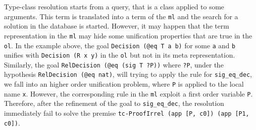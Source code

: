 \documentclass[acmengage]{acmart}
\def\coq{\proglang{coq}}
\newcommand*{\acronym}[1]{\texttt{#1}\xspace}
\def\ol{\acronym{ol}} %
\def\ml{\acronym{ml}} %
\begin{document}
Type-class resolution starts from a query, that is a class applied to some
arguments. This \coq term is translated into a term of the \ml and the search
for a solution in the database is started. However, it may happen that the term
representation in the \ml may hide some unification properties that are true in
the \ol. In the example above, the goal \texttt{Decision (@eq T a b)} for some
\texttt{a} and \texttt{b} unifies with \texttt{Decision (R x y)} in the \ol but
not in its meta representation. Similarly, the goal \texttt{RelDecision (@eq
(sig T ?P))} where \texttt{?P}, under the hypothesis \texttt{RelDecision (@eq
nat)}, will trying to apply the rule for \texttt{sig\_eq\_dec}, we fall into an
higher order unification problem, where \texttt{P} is applied to the local name
\texttt{x}. However, the corresponding rule in the \ml exploit a first order
variable \texttt{P}. Therefore, after the refinement of the goal to
\texttt{sig\_eq\_dec}, the resolution immediately fail to solve the premise
\texttt{tc-ProofIrrel (app [P, c0]) (app [P1, c0])}.



\end{document}
